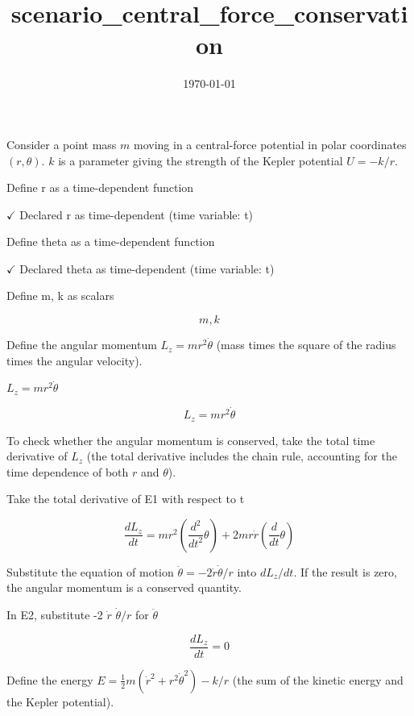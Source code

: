 \documentclass[dvipdfmx]{article}
\title{scenario\_central\_force\_conservation}
\date{\today}
\begin{document}
\maketitle

Consider a point mass $m$ moving in a central-force potential in polar coordinates $(r,\theta)$. $k$ is a parameter giving the strength of the Kepler potential $U=-k/r$.

Define r as a time-dependent function

$\checkmark$ Declared r as time-dependent (time variable: t)

Define theta as a time-dependent function

$\checkmark$ Declared theta as time-dependent (time variable: t)

Define m, k as scalars

\[
  m, k
\]

Define the angular momentum $L_z=mr^2\dot\theta$ (mass times the square of the radius times the angular velocity).

$L_z = m r^2 \dot{\theta}$

\begin{equation}
  L_z = m r^2 \dot{\theta}
  \label{eq:E1}
\end{equation}

To check whether the angular momentum is conserved, take the total time derivative of $L_z$ (the total derivative includes the chain rule, accounting for the time dependence of both $r$ and $\theta$).

Take the total derivative of E1 with respect to t

\begin{equation}
  \frac{dL_z}{dt} = m r^2 \left(\frac{d^2}{d t^2} \theta\right)+2 m r \dot{r} \left(\frac{d}{d t} \theta\right)
  \label{eq:E2}
\end{equation}

Substitute the equation of motion $\ddot\theta=-2\dot r\dot\theta/r$ into $dL_z/dt$. If the result is zero, the angular momentum is a conserved quantity.

In E2, substitute -2 $\dot{r}$ $\dot{\theta} / r$ for $\ddot{\theta}$

\begin{equation}
  \frac{dL_z}{dt} = 0
  \label{eq:E3}
\end{equation}

Define the energy $E=\frac12 m(\dot r^2+r^2\dot\theta^2)-k/r$ (the sum of the kinetic energy and the Kepler potential).
\end{document}

